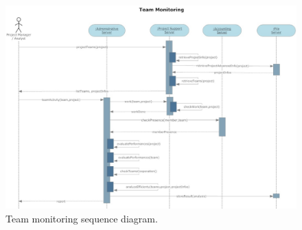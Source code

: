 \begin{figure}[H]
\begin{centering}
\includegraphics[scale=0.40,angle=90]{assign3/sdraw/imgs/team_monitoring.jpg}
\caption{Team monitoring sequence diagram.}
\label{3img:[sequence]team_monitoring}
\end{centering}
\end{figure}
